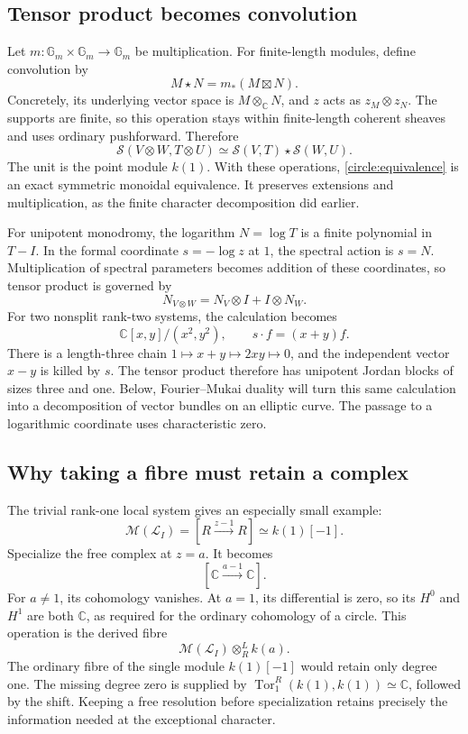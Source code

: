 \documentclass[11pt]{article}
\theoremstyle{remark}
\newcommand{\C}{\mathbb C}
\begin{document}
\subsection{Tensor product becomes convolution}

Let \(m:\mathbb G_m\times\mathbb G_m\to\mathbb G_m\) be multiplication. For finite-length modules, define convolution by
\[
M\star N=m_*(M\boxtimes N).
\]
Concretely, its underlying vector space is \(M\otimes_{\C}N\), and \(z\) acts as \(z_M\otimes z_N\). The supports are finite, so this operation stays within finite-length coherent sheaves and uses ordinary pushforward. Therefore
\begin{equation}
\mathcal S(V\otimes W,T\otimes U)
\simeq\mathcal S(V,T)\star\mathcal S(W,U).
\label{circle:convolution}
\end{equation}
The unit is the point module \(k(1)\). With these operations, \eqref{circle:equivalence} is an exact symmetric monoidal equivalence. It preserves extensions and multiplication, as the finite character decomposition did earlier.

For unipotent monodromy, the logarithm \(N=\log T\) is a finite polynomial in \(T-I\). In the formal coordinate \(s=-\log z\) at \(1\), the spectral action is \(s=N\). Multiplication of spectral parameters becomes addition of these coordinates, so tensor product is governed by
\[
N_{V\otimes W}=N_V\otimes I+I\otimes N_W.
\]
For two nonsplit rank-two systems, the calculation becomes
\[
\C[x,y]/(x^2,y^2),\qquad s\cdot f=(x+y)f.
\]
There is a length-three chain \(1\mapsto x+y\mapsto2xy\mapsto0\), and the independent vector \(x-y\) is killed by \(s\). The tensor product therefore has unipotent Jordan blocks of sizes three and one. Below, Fourier--Mukai duality will turn this same calculation into a decomposition of vector bundles on an elliptic curve. The passage to a logarithmic coordinate uses characteristic zero.

\subsection{Why taking a fibre must retain a complex}

The trivial rank-one local system gives an especially small example:
\begin{equation}
\mathcal M(\mathcal L_I)
=[R\xrightarrow{z-1}R]\simeq k(1)[-1].
\label{circle:trivial}
\end{equation}
Specialize the free complex at \(z=a\). It becomes
\[
[\C\xrightarrow{a-1}\C].
\]
For \(a\ne1\), its cohomology vanishes. At \(a=1\), its differential is zero, so its \(H^0\) and \(H^1\) are both \(\C\), as required for the ordinary cohomology of a circle. This operation is the derived fibre
\[
\mathcal M(\mathcal L_I)\otimes_R^L k(a).
\]
The ordinary fibre of the single module \(k(1)[-1]\) would retain only degree one. The missing degree zero is supplied by
\(\operatorname{Tor}_1^R(k(1),k(1))\simeq\C\), followed by the shift. Keeping a free resolution before specialization retains precisely the information needed at the exceptional character.
\end{document}
